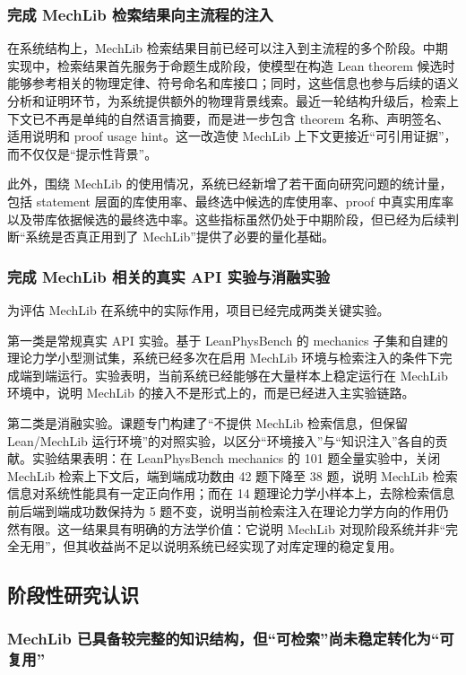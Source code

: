 \documentclass[12pt,a4paper]{ctexart}
\begin{document}
\subsubsection{完成 MechLib 检索结果向主流程的注入}

在系统结构上，MechLib 检索结果目前已经可以注入到主流程的多个阶段。中期实现中，检索结果首先服务于命题生成阶段，使模型在构造 Lean theorem 候选时能够参考相关的物理定律、符号命名和库接口；同时，这些信息也参与后续的语义分析和证明环节，为系统提供额外的物理背景线索。最近一轮结构升级后，检索上下文已不再是单纯的自然语言摘要，而是进一步包含 theorem 名称、声明签名、适用说明和 proof usage hint。这一改造使 MechLib 上下文更接近“可引用证据”，而不仅仅是“提示性背景”。

此外，围绕 MechLib 的使用情况，系统已经新增了若干面向研究问题的统计量，包括 statement 层面的库使用率、最终选中候选的库使用率、proof 中真实用库率以及带库依据候选的最终选中率。这些指标虽然仍处于中期阶段，但已经为后续判断“系统是否真正用到了 MechLib”提供了必要的量化基础。

\subsubsection{完成 MechLib 相关的真实 API 实验与消融实验}

为评估 MechLib 在系统中的实际作用，项目已经完成两类关键实验。

第一类是常规真实 API 实验。基于 LeanPhysBench 的 mechanics 子集和自建的理论力学小型测试集，系统已经多次在启用 MechLib 环境与检索注入的条件下完成端到端运行。实验表明，当前系统已经能够在大量样本上稳定运行在 MechLib 环境中，说明 MechLib 的接入不是形式上的，而是已经进入主实验链路。

第二类是消融实验。课题专门构建了“不提供 MechLib 检索信息，但保留 Lean/MechLib 运行环境”的对照实验，以区分“环境接入”与“知识注入”各自的贡献。实验结果表明：在 LeanPhysBench mechanics 的 101 题全量实验中，关闭 MechLib 检索上下文后，端到端成功数由 42 题下降至 38 题，说明 MechLib 检索信息对系统性能具有一定正向作用；而在 14 题理论力学小样本上，去除检索信息前后端到端成功数保持为 5 题不变，说明当前检索注入在理论力学方向的作用仍然有限。这一结果具有明确的方法学价值：它说明 MechLib 对现阶段系统并非“完全无用”，但其收益尚不足以说明系统已经实现了对库定理的稳定复用。

\subsection{阶段性研究认识}

\subsubsection{MechLib 已具备较完整的知识结构，但“可检索”尚未稳定转化为“可复用”}
\end{document}
